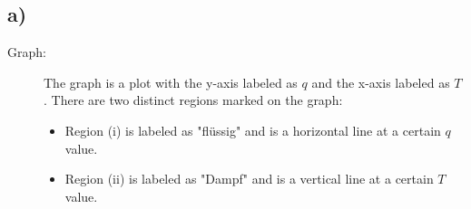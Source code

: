 

\subsection*{a)}

\begin{description}
    \item[Graph:] The graph is a plot with the y-axis labeled as $q$ and the x-axis labeled as $T$. There are two distinct regions marked on the graph:
    \begin{itemize}
        \item Region (i) is labeled as "flüssig" and is a horizontal line at a certain $q$ value.
        \item Region (ii) is labeled as "Dampf" and is a vertical line at a certain $T$ value.
    \end{itemize}
\end{description}